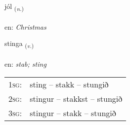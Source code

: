 \documentclass[frontgrid, backgrid]{flacards}\usepackage[]{graphicx}\usepackage[]{color}
\begin{document}
\renewcommand{\flhead}{\vskip5pt \fboxsep=0pt {\small\bfseries\footnotesize Nafnorð | Noun}}
\renewcommand{\fcfoot}{\vskip5pt \fboxsep=0pt \hspace{2pt}{\small\bfseries\footnotesize 2K}}

\renewcommand{\blhead}{\vskip5pt {\small\bfseries\footnotesize Nafnorð | Noun }}
\renewcommand{\bcfoot}{\vskip5pt \hspace{2pt}{\small\bfseries\footnotesize 2K}}


{jól \small{\textsubscript{(\textit{n.})}} \\[1ex] %
\textphonetic{[jouːl]} \\
en: \emph{Christmas} \\  [2ex]
\renewcommand*{\arraystretch}{0.8}
}

\renewcommand{\flhead}{\vskip5pt \fboxsep=0pt {\small\bfseries\footnotesize Sagnorð | Verb}}
\renewcommand{\fcfoot}{\vskip5pt \fboxsep=0pt \hspace{2pt}{\small\bfseries\footnotesize 2K}}

\renewcommand{\blhead}{\vskip5pt {\small\bfseries\footnotesize Sagnorð | Verb }}
\renewcommand{\bcfoot}{\vskip5pt \hspace{2pt}{\small\bfseries\footnotesize 2K}}


{stinga \small{\textsubscript{(\textit{v.})}} \\[1ex] %
\textphonetic{[stiŋka]} \\
en: \emph{stab; sting} \\  [2ex]
\renewcommand*{\arraystretch}{0.8}
\begin{tabular}{p{1cm}l}
\textsc{1sg}: & sting -- stakk -- stungið \\ 
\textsc{2sg}: & stingur -- stakkst -- stungið \\ 
\textsc{3sg}: & stingur -- stakk -- stungið \\ 
\end{tabular}
}
\end{document}
